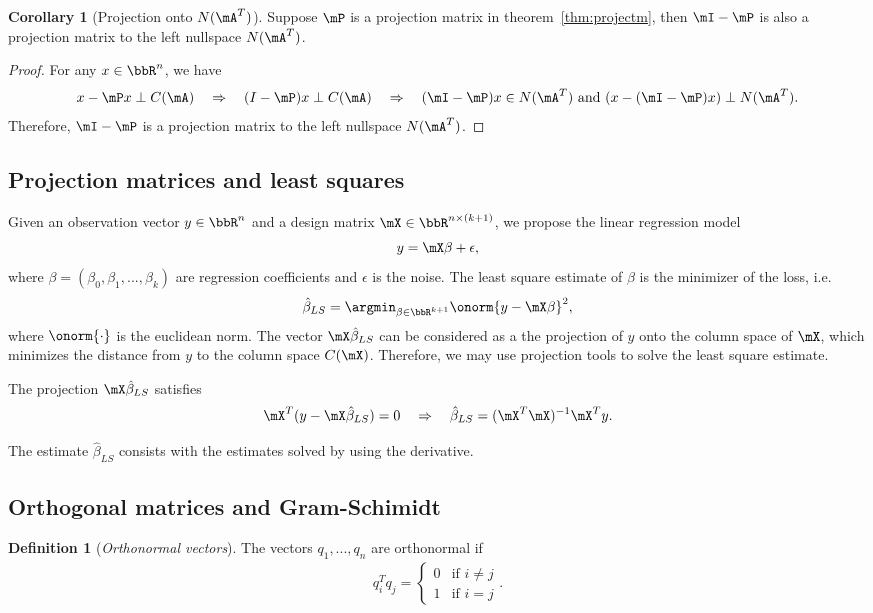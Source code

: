 \documentclass[11pt]{article}
\theoremstyle{plain}
\theoremstyle{definition}
\newtheorem{defn}{Definition}
\newtheorem{cor}{Corollary}
\begin{document}
\begin{cor}[Projection onto $N(\mA^T)$]\label{cor:iprojectm}
	Suppose $\mP$ is a projection matrix in theorem~\ref{thm:projectm}, then $\mI-\mP$ is also a projection matrix to the left nullspace $N(\mA^T)$. 
\end{cor}

\begin{proof}
	For any $x \in \bbR^n$, we have
	\[ x - \mP x \perp C(\mA) \quad \Rightarrow \quad (I-\mP)x \perp C(\mA) \quad \Rightarrow \quad  (\mI-\mP)x \in N(\mA^T) \text{ and } (x - (\mI-\mP)x) \perp N(\mA^T). \]
	Therefore, $\mI-\mP$ is a projection matrix to the left nullspace $N(\mA^T)$.
\end{proof}

\subsection{Projection matrices and least squares}
Given an observation vector $y \in \bbR^n$ and a design matrix $\mX \in \bbR^{n \times (k+1)}$, we propose the linear regression model
\[ y = \mX \beta +\epsilon,\]
where $\beta = (\beta_0,\beta_1,...,\beta_k)$ are regression coefficients and $\epsilon$ is the noise. The least square estimate of $\beta$ is the minimizer of the loss, i.e.\
\[  \hat \beta_{LS} = \argmin_{\beta \in \bbR^{k+1}} \onorm{y - \mX \beta}^2, \]
where $\onorm{\cdot}$ is the euclidean norm. The vector $\mX 
\hat \beta_{LS}$ can be considered as a the projection of $y$ onto the column space of $\mX$, which minimizes the distance from $y$ to the column space $C(\mX)$. Therefore, we may use projection tools to solve the least square estimate. 

The projection $\mX \hat \beta_{LS}$ satisfies
\[ \mX^T( y - \mX \hat \beta_{LS} ) = 0 \quad \Rightarrow \quad \hat \beta_{LS} = (\mX^T \mX)^{-1} \mX^T y. \]

The estimate $\hat \beta_{LS}$ consists with the estimates solved by using the derivative. 

\subsection{Orthogonal matrices and Gram-Schimidt}
\begin{defn}[\textit{Orthonormal vectors}]\label{def:othronov}
	The vectors $q_1,...,q_n$ are orthonormal if
	\begin{align}
		q_i^T q_j = \begin{cases}
			0& \text{if } i\neq j\\
			1 & \text{if } i =  j
		\end{cases}.
	\end{align}
\end{defn}
\end{document}
